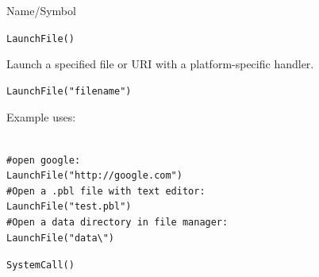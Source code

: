 \begin{desc}{Name/Symbol}
\item[Name/Symbol]	\verb+LaunchFile()+

\item[Description]	Launch a specified file or URI with a platform-specific handler.

\item[Usage]
\begin{verbatim}
LaunchFile("filename")
\end{verbatim}

\item[Example]
Example uses:
\begin{verbatim}

#open google:
LaunchFile("http://google.com")    
#Open a .pbl file with text editor:
LaunchFile("test.pbl")             
#Open a data directory in file manager:
LaunchFile("data\")                
\end{verbatim}

\item[See Also] 
  \verb+SystemCall()+

\end{desc}




